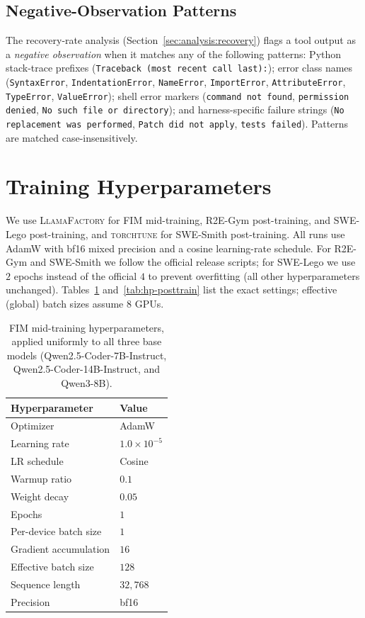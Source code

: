 \subsection{Negative-Observation Patterns}
\label{app:algo:neg_patterns}

The recovery-rate analysis (Section~\ref{sec:analysis:recovery}) flags
a tool output as a \emph{negative observation} when it matches any of
the following patterns: Python stack-trace prefixes
(\texttt{Traceback (most recent call last):}); error class names
(\texttt{SyntaxError}, \texttt{IndentationError}, \texttt{NameError},
\texttt{ImportError}, \texttt{AttributeError}, \texttt{TypeError},
\texttt{ValueError}); shell error markers
(\texttt{command not found}, \texttt{permission denied}, \texttt{No such file or directory});
and harness-specific failure strings
(\texttt{No replacement was performed}, \texttt{Patch did not apply},
\texttt{tests failed}). Patterns are matched case-insensitively.


\section{Training Hyperparameters}
\label{app:hp}

We use \textsc{LlamaFactory} for FIM mid-training, R2E-Gym
post-training, and SWE-Lego post-training, and \textsc{torchtune} for
SWE-Smith post-training. All runs use AdamW with bf16 mixed precision
and a cosine learning-rate schedule. For R2E-Gym and SWE-Smith we follow
the official release scripts; for SWE-Lego we use $2$ epochs instead of
the official $4$ to prevent overfitting (all other hyperparameters
unchanged). Tables~\ref{tab:hp-midtrain} and~\ref{tab:hp-posttrain} list
the exact settings; effective (global) batch sizes assume $8$ GPUs.

\begin{table}[h]
\centering
\footnotesize
\caption{FIM mid-training hyperparameters, applied uniformly to all
three base models (Qwen2.5-Coder-7B-Instruct,
Qwen2.5-Coder-14B-Instruct, and Qwen3-8B).}
\label{tab:hp-midtrain}
\setlength{\tabcolsep}{8pt}
\begin{tabular}{ll}
\toprule
\textbf{Hyperparameter} & \textbf{Value} \\
\midrule
Optimizer             & AdamW \\
Learning rate         & $1.0\!\times\!10^{-5}$ \\
LR schedule           & Cosine \\
Warmup ratio          & $0.1$ \\
Weight decay          & $0.05$ \\
Epochs                & $1$ \\
Per-device batch size & $1$ \\
Gradient accumulation & $16$ \\
Effective batch size  & $128$ \\
Sequence length       & $32{,}768$ \\
Precision             & bf16 \\
\bottomrule
\end{tabular}
\end{table}

